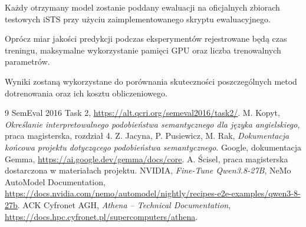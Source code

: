 \documentclass[a4paper,10pt]{article}
\begin{document}
Każdy otrzymany model zostanie poddany ewaluacji
na oficjalnych zbiorach testowych iSTS przy użyciu
zaimplementowanego skryptu ewaluacyjnego.

Oprócz miar jakości predykcji podczas eksperymentów
rejestrowane będą czas treningu, maksymalne wykorzystanie
pamięci GPU oraz liczba trenowalnych parametrów.

Wyniki zostaną wykorzystane do porównania skuteczności
poszczególnych metod dotrenowania oraz ich kosztu
obliczeniowego.

    \begin{thebibliography}{9}
         SemEval 2016 Task 2, \url{https://alt.qcri.org/semeval2016/task2/}.
         M. Kopyt, \textit{Określanie interpretowalnego podobieństwa semantycznego dla języka angielskiego}, praca magisterska, rozdział 4.
         Z. Jacyna, P. Pusiewicz, M. Rak, \textit{Dokumentacja końcowa projektu dotyczącego podobieństwa semantycznego}.
         Google, dokumentacja Gemma, \url{https://ai.google.dev/gemma/docs/core}.
         A. Ścisel, praca magisterska dostarczona w materiałach projektu.
        NVIDIA, \textit{Fine-Tune Qwen3.8-27B}, NeMo AutoModel Documentation, \url{https://docs.nvidia.com/nemo/automodel/nightly/recipes-e2e-examples/qwen3-8-27b}.
        ACK Cyfronet AGH, \textit{Athena -- Technical Documentation}, \url{https://docs.hpc.cyfronet.pl/supercomputers/athena}.
    \end{thebibliography}
\end{document}

